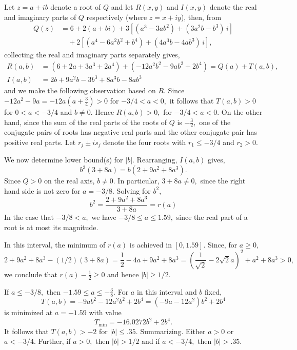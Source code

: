 \documentclass[a4paper,reqno,index]{amsart}
\numberwithin{equation}{section}
\theoremstyle{definition}
\begin{document}
 Let  $z=a+ib$ denote  a root of $Q$ and  let $R(x,y)$ and $I(x,y)$
 denote  the real and imaginary parts of $Q$ respectively
 (where $z=x+iy$), then, from 
\[
\begin{aligned}
Q(z) &= 6 + 2(a+bi)
      + 3\!\left[(a^{3}-3ab^{2}) + (3a^{2}b-b^{3})\,i\right] \\
     &\quad+ 2\!\left[(a^{4}-6a^{2}b^{2}+b^{4}) + (4a^{3}b-4ab^{3})\,i \right],
\end{aligned}
\]
collecting the real and imaginary parts separately gives,
\[
\begin{aligned}
R(a,b) &=
  (6 + 2a + 3a^{3}  + 2a^{4}) + ( - 12a^{2}b^{2} - 9ab^{2} + 2b^{4})
   = Q(a) + T(a,b), \\[6pt]
I(a,b) &=
  2b + 9a^{2}b - 3b^{3} + 8a^{3}b - 8ab^{3}
\end{aligned}
\]
 and we make the following observation based on $R.$ Since
 $-12a^2 -9a = -12a(a+ \frac{3}{4})>0$ for $-3/4 < a < 0,$ 
 it follows that  $T(a,b)> 0$ for $0<a<-3/4$ and $b\neq 0.$ Hence $R(a,b)> 0,$
 for $-3/4<a<0.$  On the other hand, since the sum of the real parts of the roots of $Q$ is $-\frac32,$ 
  one of the conjugate pairs of roots has negative real parts and the other conjugate pair has
  positive real parts. Let $r_j \pm i s_j$ denote the four roots
  with $r_1 \le -3/4$ and $r_2>0.$ 

 We now determine lower bound(s) for $|b|.$ Rearranging, $I(a,b)$ gives,
\[
 b^3(3+8a)=b(2+9a^2+8a^3).
\]
 Since $Q>0$ on the real axis, $b\ne 0.$ 
 In particular, $3+8a\ne 0,$ since the right hand side is not
 zero for $a=-3/8.$ 
Solving for $b^2,$ 
\[
 b^2 =\frac{2+9a^2+8a^3}{3+8a} = r(a)
\]
In the case that $-3/8 <a,$ we have $-3/8 \le a\le 1.59,$
since the real part of a  root is at most its magnitude.

In this interval, the minimum of $r(a)$ is achieved in
$[0,1.59].$ Since, for $a\ge 0,$
\[
  2+9a^2+8a^3 -(1/2)(3+8a) = \frac12 -4a + 9a^2 +8a^3
  = (\frac{1}{\sqrt{2}} - 2\sqrt{2} a)^2 + a^2 +8 a^3 >0,
\]
 we conclude that $r(a)-\frac12 \ge 0$ and hence $|b|\ge 1/2.$


 If $a\le -3/8,$ then $-1.59 \le a \le -\frac38.$ For $a$ 
 in this interval and $b$ fixed,
\[
 T(a,b)= -9ab^2-12 a^2 b^2 + 2b^4 =(-9a-12a^2)b^2+2b^4
\]
 is minimized at $a=-1.59$ with value
 \[
   T_{\text{min}} = -16.0272 b^2+2b^4.
 \]
 It follows that $T(a,b)>-2$ for $|b|\le .35.$
Summarizing. Either $a>0$ or $a<-3/4.$  Further, if $a>0,$ then $|b|>1/2$ and if $a<-3/4,$ then $|b|>.35.$ 
\end{document}
